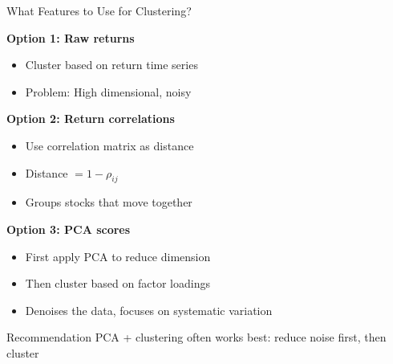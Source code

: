 \documentclass[10pt]{beamer}
\begin{document}
\begin{frame}{What Features to Use for Clustering?}

  \textbf{Option 1: Raw returns}
  \begin{itemize}
    \item Cluster based on return time series
    \item Problem: High dimensional, noisy
  \end{itemize}

  \vspace{0.5em}
  \textbf{Option 2: Return correlations}
  \begin{itemize}
    \item Use correlation matrix as distance
    \item Distance $= 1 - \rho_{ij}$
    \item Groups stocks that move together
  \end{itemize}

  \vspace{0.5em}
  \textbf{Option 3: PCA scores}
  \begin{itemize}
    \item First apply PCA to reduce dimension
    \item Then cluster based on factor loadings
    \item Denoises the data, focuses on systematic variation
  \end{itemize}

  \vspace{0.5em}
  \begin{block}{Recommendation}
    PCA + clustering often works best: reduce noise first, then cluster
  \end{block}
\end{frame}

\end{document}
